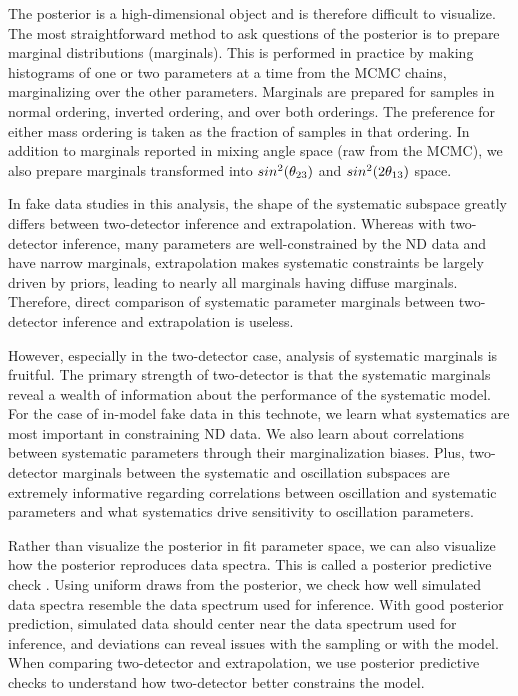 \documentclass{article}
\begin{document}
The posterior is a high-dimensional object and is therefore difficult to visualize. The most straightforward method to ask questions of the posterior is to prepare marginal distributions (marginals). This is performed in practice by making histograms of one or two parameters at a time from the MCMC chains, marginalizing over the other parameters. Marginals are prepared for samples in normal ordering, inverted ordering, and over both orderings. The preference for either mass ordering is taken as the fraction of samples in that ordering. In addition to marginals reported in mixing angle space (raw from the MCMC), we also prepare marginals transformed into $sin^2(\theta_{23})$ and $sin^2(2\theta_{13})$ space.

In fake data studies in this analysis, the shape of the systematic subspace greatly differs between two-detector inference and extrapolation. Whereas with two-detector inference, many parameters are well-constrained by the ND data and have narrow marginals, extrapolation makes systematic constraints be largely driven by priors, leading to nearly all marginals having diffuse marginals. Therefore, direct comparison of systematic parameter marginals between two-detector inference and extrapolation is useless.

However, especially in the two-detector case, analysis of systematic marginals is fruitful. The primary strength of two-detector is that the systematic marginals reveal a wealth of information about the performance of the systematic model. For the case of in-model fake data in this technote, we learn what systematics are most important in constraining ND data. We also learn about correlations between systematic parameters through their marginalization biases. Plus, two-detector marginals between the systematic and oscillation subspaces are extremely informative regarding correlations between oscillation and systematic parameters and what systematics drive sensitivity to oscillation parameters.

Rather than visualize the posterior in fit parameter space, we can also visualize how the posterior reproduces data spectra. This is called a posterior predictive check \cite{ref:stan_posterior_predictive}. Using uniform draws from the posterior, we check how well simulated data spectra resemble the data spectrum used for inference. With good posterior prediction, simulated data should center near the data spectrum used for inference, and deviations can reveal issues with the sampling or with the model. When comparing two-detector and extrapolation, we use posterior predictive checks to understand how two-detector better constrains the model.
\end{document}
